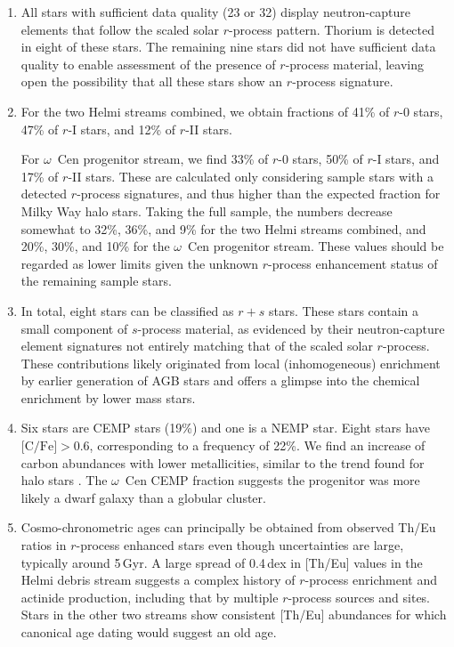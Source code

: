 \documentclass[twocolumn]{aastex63}
\begin{document}
\begin{enumerate} 

\item All stars with sufficient data quality (23 or 32) display neutron-capture elements that follow the scaled solar $r$-process pattern. Thorium is detected in eight of these stars. The remaining nine stars did not have sufficient data quality to enable assessment of the presence of $r$-process material, leaving open the possibility that all these stars show an $r$-process signature. 

\item For the two Helmi streams combined, we obtain fractions of 41\% of $r$-0 stars, 47\% of $r$-I stars, and 12\% of $r$-II stars. 

For $\omega$~Cen progenitor stream, we find 33\% of $r$-0 stars, 50\% of $r$-I stars, and 17\% of $r$-II stars. These are calculated only considering sample stars with a detected $r$-process signatures, and thus higher than the expected fraction for Milky Way halo stars. Taking the full sample, the numbers decrease somewhat to 32\%, 36\%, and 9\% for the two Helmi streams combined, and 20\%, 30\%, and 10\% for the $\omega$~Cen progenitor stream. These values should be regarded as lower limits given the unknown $r$-process enhancement status of the remaining sample stars.

\item In total, eight stars can be classified as $r+s$ stars. These stars contain a small component of $s$-process material, as evidenced by their neutron-capture element signatures not entirely matching that of the scaled solar $r$-process. These contributions likely originated from local (inhomogeneous) enrichment by earlier generation of AGB stars and offers a glimpse into the chemical enrichment by lower mass stars.

\item Six stars are CEMP stars (19\%) and one is a NEMP star. Eight stars have $\mbox{[C/Fe]}>0.6$, corresponding to a frequency of 22\%. We find an increase of carbon abundances with lower metallicities, similar to the trend found for halo stars \citep{Placco14}. The $\omega$~Cen CEMP fraction suggests the progenitor was more likely a dwarf galaxy than a globular cluster.

\item Cosmo-chronometric ages can principally be obtained from observed Th/Eu ratios in $r$-process enhanced stars even though uncertainties are large, typically around 5\,Gyr. A large spread of 0.4\,dex in [Th/Eu] values in the Helmi debris stream suggests a complex history of $r$-process enrichment and actinide production, including that by multiple $r$-process sources and sites. Stars in the other two streams show consistent [Th/Eu] abundances for which canonical age dating would suggest an old age. 

\end{enumerate}
\end{document}
